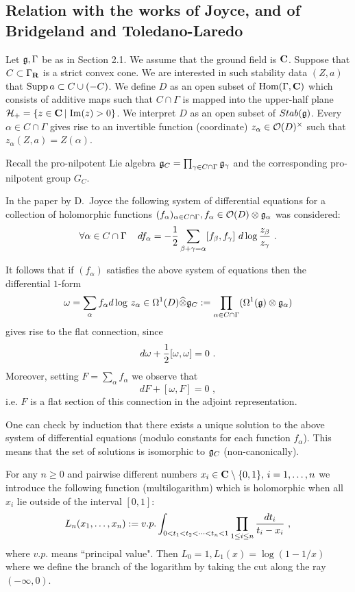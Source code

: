 \documentclass[12pt]{article}
\begin{document}
\subsection{Relation with the works of Joyce, and of Bridgeland and Toledano-Laredo}

Let ${\mathfrak g}, \Gamma$ be as in Section 2.1. We assume that the ground field is ${\bf C}$.
Suppose that
$C\subset \Gamma_{{\bf R}}$ is a strict convex cone. We are interested in such stability data $(Z,a)$ that
$\operatorname{Supp}a\subset C\cup (-C)$.
We define $D$ as an open subset of $\operatorname{Hom}(\Gamma, {\bf C})$ which consists
of additive maps such that $C\cap \Gamma$ is mapped into the upper-half plane ${\cal{H}}_+=\{
z\in {\bf C}\,|\,\operatorname{Im}(z)>0\}$.
We interpret $D$ as an open subset of $Stab({\mathfrak g})$.
Every $\alpha\in C\cap {\Gamma}$ gives rise to an invertible
function (coordinate) $z_{\alpha}\in {\cal O}(D)^{\times}$ such that $z_{\alpha}(Z,a)=Z(\alpha)$.

Recall the pro-nilpotent Lie algebra ${\mathfrak g}_C=\prod_{\gamma \in C\cap \Gamma}{\mathfrak g}_{\gamma}$ and the corresponding pro-nilpotent group $G_C$.



In the paper \cite{Jo1} by D.~Joyce  the following system of differential
equations for a collection of holomorphic functions
$(f_{\alpha})_{\alpha \in C\cap {\Gamma}}, f_{\alpha}\in {\cal O}(D)\otimes {\mathfrak g}_{\alpha}$ was considered:
$$\forall \alpha \in C\cap \Gamma\,\,\,\,\,\,\,df_{\alpha}=-{1\over{2}}\sum_{\beta+\gamma=\alpha}[f_{\beta},f_{\gamma}]\,\,d\log{z_{\beta}
\over{z_{\gamma}}}\,\,.$$

It follows that if $(f_{\alpha})$ satisfies the above system of equations then
the differential $1$-form 
$$\omega=\sum_{\alpha}f_{\alpha}d\log\,z_{\alpha}\in \Omega^1(D)\widehat{\otimes} {{\mathfrak g}}_C:=\prod_{\alpha \in C\cap \Gamma}(\Omega^1({\mathfrak g})\otimes {\mathfrak g}_{\alpha})$$
 gives rise to the flat connection,
since $$d\omega+{1\over{2}}[\omega,\omega]=0\,\,.$$
 Moreover, setting $F=\sum_{\alpha}f_{\alpha}$ we observe that
$$dF+[\omega,F]=0\,\,,$$
i.e. $F$ is a flat section of this connection in the adjoint representation.

One can check by induction that there exists a unique solution to the above system of differential
equations (modulo constants for each function $f_{\alpha}$). This means that the set
of solutions is isomorphic to ${{\mathfrak g}}_C$ (non-canonically).

For any $n\geqslant 0$ and pairwise different numbers $x_i\in {\bf C}\setminus \{0,1\},\,i=1,\dots,n$ we introduce the following function (multilogarithm) which is holomorphic when all $x_i$ lie outside of the interval $[0,1]$:
$$L_n(x_1,\dots,x_n):=v.p.\int_{0<t_1<t_2<\dots<t_n<1}\prod_{1\le i\le n}{dt_i\over{t_i-x_i}}\,\,,$$
where $v.p.$ means ``principal value".
Then $L_0=1,L_1(x)=\log(1-1/x)$ where we define the branch of the logarithm by taking the cut along the ray $(-\infty,0)$.
\end{document}
